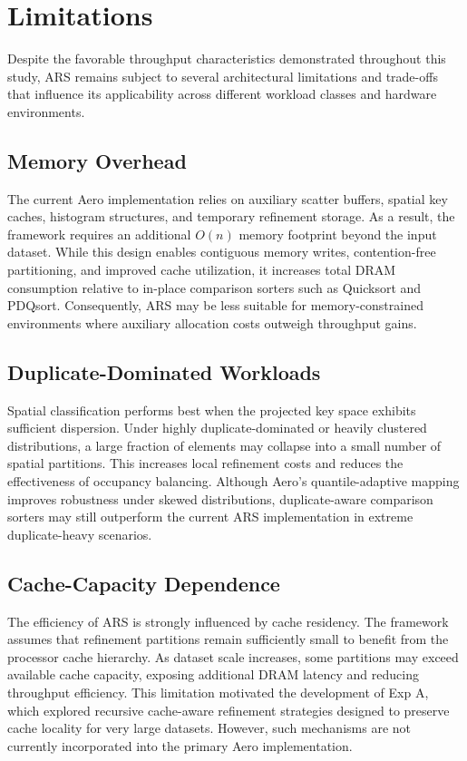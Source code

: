 \section{Limitations}
Despite the favorable throughput characteristics demonstrated throughout this study, ARS remains subject to several architectural limitations and trade-offs that influence its applicability across different workload classes and hardware environments.

\subsection{Memory Overhead}
The current Aero implementation relies on auxiliary scatter buffers, spatial key caches, histogram structures, and temporary refinement storage.
As a result, the framework requires an additional $O(n)$ memory footprint beyond the input dataset.
While this design enables contiguous memory writes, contention-free partitioning, and improved cache utilization, it increases total DRAM consumption relative to in-place comparison sorters such as Quicksort and PDQsort.
Consequently, ARS may be less suitable for memory-constrained environments where auxiliary allocation costs outweigh throughput gains.

\subsection{Duplicate-Dominated Workloads}
Spatial classification performs best when the projected key space exhibits sufficient dispersion.
Under highly duplicate-dominated or heavily clustered distributions, a large fraction of elements may collapse into a small number of spatial partitions.
This increases local refinement costs and reduces the effectiveness of occupancy balancing.
Although Aero's quantile-adaptive mapping improves robustness under skewed distributions, duplicate-aware comparison sorters may still outperform the current ARS implementation in extreme duplicate-heavy scenarios.

\subsection{Cache-Capacity Dependence}
The efficiency of ARS is strongly influenced by cache residency.
The framework assumes that refinement partitions remain sufficiently small to benefit from the processor cache hierarchy.
As dataset scale increases, some partitions may exceed available cache capacity, exposing additional DRAM latency and reducing throughput efficiency.
This limitation motivated the development of Exp A, which explored recursive cache-aware refinement strategies designed to preserve cache locality for very large datasets.
However, such mechanisms are not currently incorporated into the primary Aero implementation.

